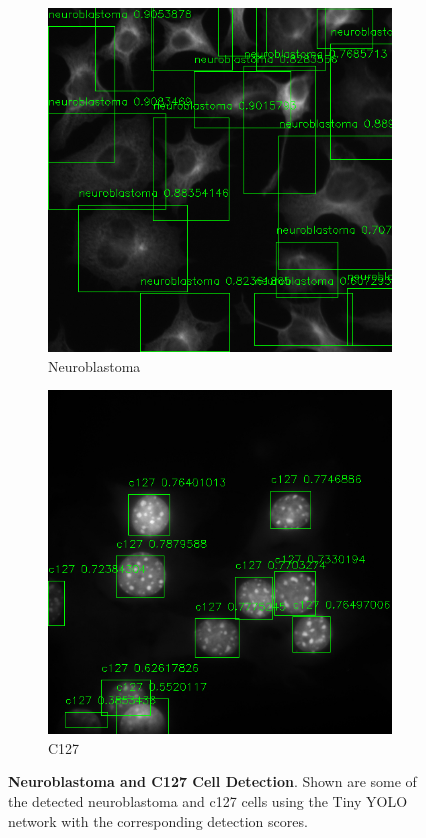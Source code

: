\documentclass[10pt, journal, compsoc]{IEEEtran}
\begin{document}
\begin{figure}
\begin{subfigure}[b]{0.49\linewidth}
\end{subfigure}
\begin{subfigure}[b]{0.49\linewidth}
\includegraphics[width=\linewidth]{110085.png}
\caption*{Neuroblastoma}
\end{subfigure}
\begin{subfigure}[b]{0.49\linewidth}
\includegraphics[width=\linewidth]{c127/yolo/108641.png}
\caption*{C127}
\end{subfigure}
\caption{\textbf{Neuroblastoma and C127 Cell Detection}. Shown are some of the detected neuroblastoma and c127 cells using the Tiny YOLO network with the corresponding detection scores.}
\label{fig:yolo_results}
\end{figure}
\end{document}
